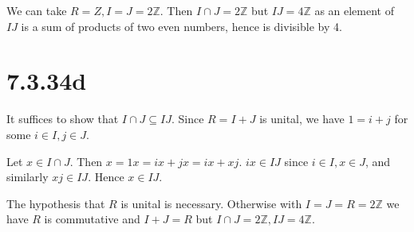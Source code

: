 \documentclass{article}
\def\Z{\mathbb{Z}}
\begin{document}
We can take $R = Z, I = J = 2\Z$. Then $I \cap J = 2\Z$ but $IJ = 4\Z$ as an element of $IJ$ is a sum of products of two even numbers, hence is divisible by 4.

\section*{7.3.34d}

It suffices to show that $I \cap J \subseteq IJ$. Since $R = I + J$ is unital, we have $1 = i + j$ for some $i \in I, j \in J$.

Let $x \in I \cap J$. Then $x = 1x = ix + jx = ix + xj$. $ix \in IJ$ since $i \in I, x \in J$, and similarly $xj \in IJ$. Hence $x \in IJ$.

The hypothesis that $R$ is unital is necessary. Otherwise with $I = J = R = 2\Z$ we have $R$ is commutative and $I + J = R$ but $I \cap J = 2\Z, IJ = 4\Z$.
\end{document}

